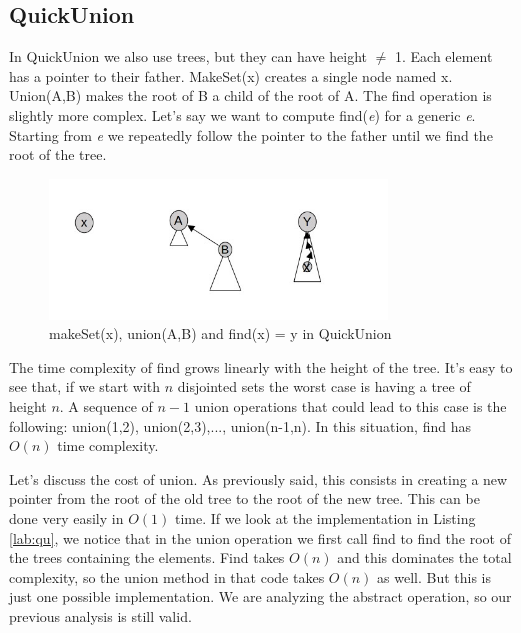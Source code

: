 \documentclass{article}
\begin{document}
\subsection{QuickUnion} \label{QU}
In QuickUnion we also use trees, but they can have height $\neq$ 1. Each element has a pointer to their
father. MakeSet(x) creates a single node named x. Union(A,B) makes the root of B a child of the 
root of A. The find operation is slightly more complex. Let's say
we want to compute find(\emph{e}) for a generic \emph{e}. Starting from \emph{e} we repeatedly 
follow the pointer to the father until we find the root of the tree.
\begin{figure}[h!]
    \centering
    \includegraphics[width=0.8\textwidth]  {img/uf.jpg}
    \caption{makeSet(x), union(A,B) and find(x) = y in QuickUnion}
    \label{fig:quickUnion}
\end{figure}

The time complexity of find grows linearly with the height of the tree. It's easy to see
that, if we start with $n$ disjointed sets the worst case is having a tree of height $n$. A sequence
of $n-1$ union operations that could lead to this case is the following: union(1,2), union(2,3),..., union(n-1,n).
In this situation, find has $O(n)$ time complexity. 
\begin{center}
     
\end{center}
Let's discuss the cost of union. As previously said,
this consists in creating a new pointer from the root of the old tree to the root of the new tree. This can be done 
very easily in $O(1)$ time. If we look at the implementation in Listing \ref{lab:qu}, we notice
that in the union operation we first call find to find the root of the trees containing the elements. Find takes $O(n)$ and this dominates the 
total complexity, so the union method in that code takes $ O(n)$ as well. But this is just one possible implementation. We are analyzing
the abstract operation, so our previous analysis is still valid. 
\end{document}
